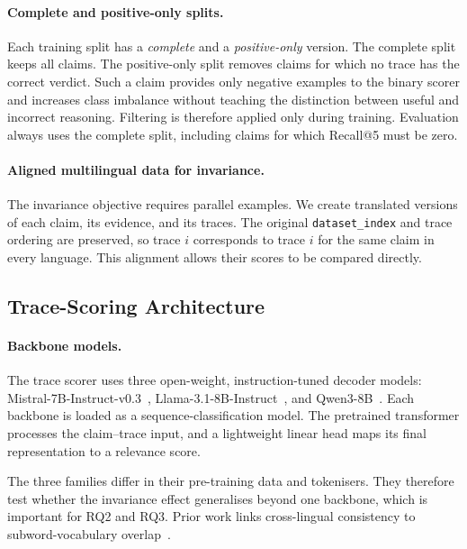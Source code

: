 \paragraph{Complete and positive-only splits.}
Each training split has a \emph{complete} and a \emph{positive-only} version. The complete split keeps
all claims. The positive-only split removes claims for which no trace has the correct verdict. Such a
claim provides only negative examples to the binary scorer and increases class imbalance without
teaching the distinction between useful and incorrect reasoning. Filtering is therefore applied only
during training. Evaluation always uses the complete split, including claims for which Recall@5 must
be zero.

\paragraph{Aligned multilingual data for invariance.}
The invariance objective requires parallel examples. We create translated versions of each claim,
its evidence, and its traces. The original \texttt{dataset\_index} and trace ordering are preserved,
so trace $i$ corresponds to trace $i$ for the same claim in every language. This alignment allows
their scores to be compared directly.

\subsection{Trace-Scoring Architecture}
\label{subsec:method-scorer}

\paragraph{Backbone models.}
The trace scorer uses three open-weight, instruction-tuned decoder models:
Mistral-7B-Instruct-v0.3~\cite{jiang2023mistral7b}, Llama-3.1-8B-Instruct~\cite{llama31instruct},
and Qwen3-8B~\cite{qwen3technicalreport}. Each backbone is loaded as a sequence-classification
model. The pretrained transformer processes the claim--trace input, and a lightweight linear head
maps its final representation to a relevance score.

The three families differ in their pre-training data and tokenisers. They therefore test whether the
invariance effect generalises beyond one backbone, which is important for RQ2 and RQ3. Prior work
links cross-lingual consistency to subword-vocabulary
overlap~\cite{Qi_2023,reddy2026effectscriptsformatsllm}.

